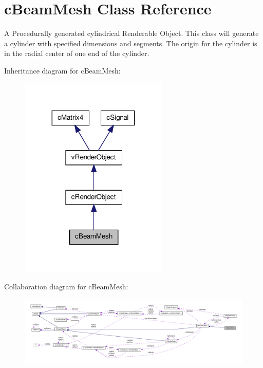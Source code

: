 \hypertarget{classc_beam_mesh}{
\section{cBeamMesh Class Reference}
\label{classc_beam_mesh}
}


A Procedurally generated cylindrical Renderable Object. This class will generate a cylinder with specified dimensions and segments. The origin for the cylinder is in the radial center of one end of the cylinder.  




Inheritance diagram for cBeamMesh:
\nopagebreak
\begin{figure}[H]
\begin{center}
\leavevmode
\includegraphics[width=200pt]{classc_beam_mesh__inherit__graph}
\end{center}
\end{figure}


Collaboration diagram for cBeamMesh:
\nopagebreak
\begin{figure}[H]
\begin{center}
\leavevmode
\includegraphics[width=400pt]{classc_beam_mesh__coll__graph}
\end{center}
\end{figure}
